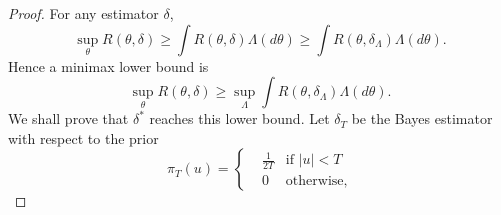 \documentclass{article}
\theoremstyle{plain}
\theoremstyle{definition}
\begin{document}
\begin{proof}
    For any estimator $\delta$,
    \begin{equation*}
        \sup_{\theta}R(\theta,\delta)
        \geq \int R(\theta,\delta)\Lambda(d\theta)
        \geq \int R(\theta,\delta_\Lambda)\Lambda(d\theta).
    \end{equation*}
    Hence a minimax lower bound is
    \begin{equation*}
        \sup_{\theta}R(\theta,\delta)
        \geq \sup_{\Lambda} \int R(\theta,\delta_\Lambda)\Lambda(d\theta).
    \end{equation*}
    We shall prove that $\delta^*$ reaches this lower bound.
    Let $\delta_T$ be the Bayes estimator with respect to the prior
    \begin{equation*}
        \pi_T(u)=\left\{\begin{aligned}&\frac{1}{2T}&\textrm{if $|u|<T$}\\
        &0&\textrm{otherwise,}\end{aligned}\right.
    \end{equation*}
    


\end{proof}
\end{document}
